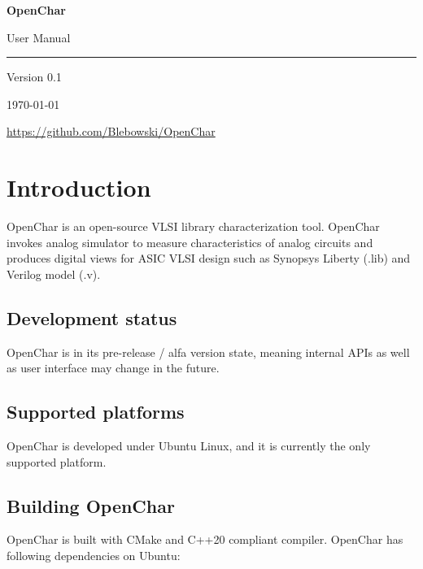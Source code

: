 \documentclass[12pt, a4paper]{article}
\newcommand{\documentversion}{0.1}
\begin{document}
\begin{titlepage}
    \thispagestyle{plain}

    \vspace*{3cm}

    \Huge\bfseries{OpenChar}

    \vspace*{0.5cm}

    \Large{User Manual}

    \textcolor{gray}{\rule{0.9\textwidth}{0.4pt}}

    {\normalsize Version \documentversion}

    {\normalsize\today}

    \vfill

    {\small
        \href{https://github.com/Blebowski/OpenChar}{https://github.com/Blebowski/OpenChar}
    }
\end{titlepage}

\tableofcontents
\newpage

\section{Introduction}

OpenChar is an open-source VLSI library characterization tool. OpenChar invokes analog
simulator to measure characteristics of analog circuits and produces digital views for
ASIC VLSI design such as Synopsys Liberty (.lib) and Verilog model (.v).

\subsection{Development status}

OpenChar is in its pre-release / alfa version state, meaning internal APIs as well
as user interface may change in the future.

\subsection{Supported platforms}

OpenChar is developed under Ubuntu Linux, and it is currently the only supported platform.

\subsection{Building OpenChar}

OpenChar is built with CMake and C++20 compliant compiler. OpenChar has following
dependencies on Ubuntu:
\end{document}
